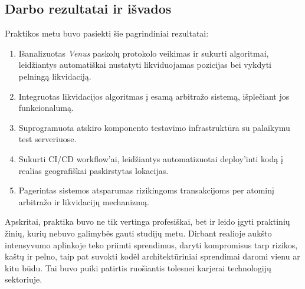 \documentclass[]{VUMIFTemplateClass}
\begin{document}
\subsection{Darbo rezultatai ir išvados}

Praktikos metu buvo pasiekti šie pagrindiniai rezultatai:

\begin{enumerate}
    \item Išanalizuotas \textit{Venus} paskolų protokolo veikimas ir sukurti algoritmai, leidžiantys automatiškai nustatyti likviduojamas pozicijas bei vykdyti pelningą likvidaciją.
    \item Integruotas likvidacijos algoritmas į esamą arbitražo sistemą, išplečiant jos funkcionalumą.
    \item Suprogramuota atskiro komponento testavimo infrastruktūra su palaikymu test serveriuose.
    \item Sukurti CI/CD workflow’ai, leidžiantys automatizuotai deploy’inti kodą į realias geografiškai paskirstytas lokacijas.
    \item Pagerintas sistemos atsparumas rizikingoms transakcijoms per atominį arbitražo ir likvidacijų mechanizmą.
\end{enumerate}

Apskritai, praktika buvo ne tik vertinga profesiškai, bet ir leido įgyti praktinių žinių, kurių nebuvo galimybės gauti studijų metu. Dirbant realioje aukšto intensyvumo aplinkoje teko priimti sprendimus, daryti kompromisus tarp rizikos, kaštų ir pelno, taip pat suvokti kodėl architektūriniai sprendimai daromi vienu ar kitu būdu. Tai buvo puiki patirtis ruošiantis tolesnei karjerai technologijų sektoriuje.
\end{document}
